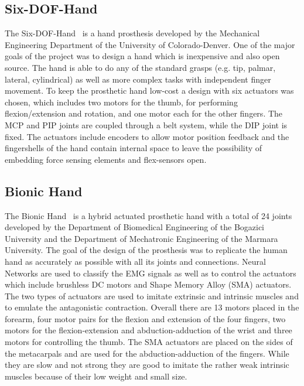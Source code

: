 \documentclass[a4paper, 10pt, conference]{ieeeconf}      %
\begin{document}
\subsection{Six-DOF-Hand}

The Six-DOF-Hand~\cite{6dofhand} is a hand prosthesis developed by the Mechanical Engineering Department of the University of Colorado-Denver. One of the major goals of the project was to design a hand which is inexpensive and also open source. The hand is able to do any of the standard grasps (e.g. tip, palmar, lateral, cylindrical) as well as more complex tasks with independent finger movement. To keep the prosthetic hand low-cost a design with six actuators was chosen, which includes two motors for the thumb, for performing flexion/extension and rotation, and one motor each for the other fingers. The MCP and PIP joints are coupled through a belt system, while the DIP joint is fixed. The actuators include encoders to allow motor position feedback and the fingershells of the hand contain internal space to leave the possibility of embedding force sensing elements and flex-sensors open.

\subsection{Bionic Hand}

The Bionic Hand~\cite{bionichand} is a hybrid actuated prosthetic hand with a total of 24 joints developed by the Department of Biomedical Engineering of the Bogazici University and the Department of Mechatronic Engineering of the Marmara University. The goal of the design of the prosthesis was to replicate the human hand as accurately as possible with all its joints and connections. Neural Networks are used to classify the EMG signals as well as to control the actuators which include brushless DC motors and Shape Memory Alloy (SMA) actuators. The two types of actuators are used to imitate extrinsic and intrinsic muscles and to emulate the antagonistic contraction. Overall there are 13 motors placed in the forearm, four motor pairs for the flexion and extension of the four fingers, two motors for the flexion-extension and abduction-adduction of the wrist and three motors for controlling the thumb. The SMA actuators are placed on the sides of the metacarpals and are used for the abduction-adduction of the fingers. While they are slow and not strong they are good to imitate the rather weak intrinsic muscles because of their low weight and small size.
\end{document}
